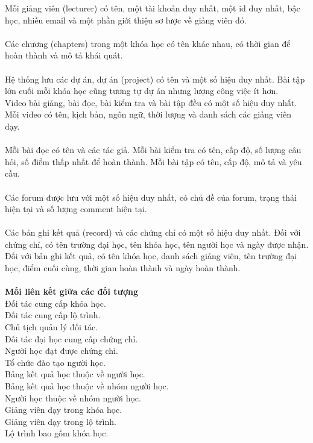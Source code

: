 \documentclass[12pt,a4paper,titlepage]{article}
\begin{document}
Mỗi giảng viên (lecturer) có tên, một tài khoản duy nhất, một id duy nhất, bậc học, nhiều email và một phần giới thiệu sơ lược về giảng viên đó.\\\\
Các chương (chapters) trong một khóa học có tên khác nhau, có thời gian để hoàn thành và mô tả khái quát.\\\\
Hệ thống lưu các dự án, dự án (project) có tên và một số hiệu duy nhất. Bài tập lớn cuối mỗi khóa học cũng tương tự dự án nhưng lượng công việc ít hơn.\\
Video bài giảng, bài đọc, bài kiểm tra và bài tập đều có một số hiệu duy nhất. Mỗi video có tên, kịch bản, ngôn ngữ, thời lượng và danh sách các giảng viên dạy.\\\\
Mỗi bài đọc có tên và các tác giả. Mỗi bài kiểm tra có tên, cấp độ, số lượng câu hỏi, số điểm thấp nhất để hoàn thành. Mỗi bài tập có tên, cấp độ, mô tả và yêu cầu.\\\\
Các forum được lưu với một số hiệu duy nhất, có chủ đề của forum, trạng thái hiện tại và số lượng comment hiện tại.\\\\
Các bản ghi kết quả (record) và các chứng chỉ có một số hiệu duy nhất. Đối với chứng chỉ, có tên trường đại học, tên khóa học, tên người học và ngày được nhận. Đối với bản ghi kết quả, có tên khóa học, danh sách giảng viên, tên trường đại học, điểm cuối cùng, thời gian hoàn thành và ngày hoàn thành.\\\\
\textbf{Mối liên kết giữa các đối tượng}\\
Đối tác cung cấp khóa học.\\
Đối tác cung cấp lộ trình.\\
Chủ tịch quản lý đối tác.\\
Đối tác đại học cung cấp chứng chỉ.\\
Người học đạt được chứng chỉ.\\
Tổ chức đào tạo người học.\\
Bảng kết quả học thuộc về người học.\\
Bảng kết quả học thuộc về nhóm người học.\\
Người học thuộc về nhóm người học.\\
Giảng viên dạy trong khóa học.\\
Giảng viên dạy trong lộ trình.\\
Lộ trình bao gồm khóa học.\\
\end{document}
